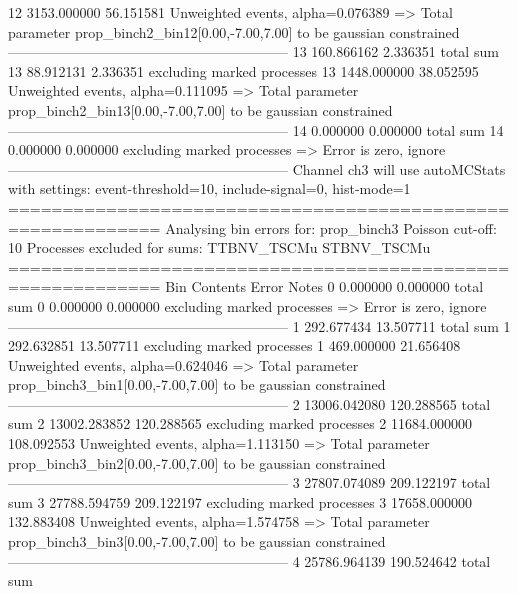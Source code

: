 12         3153.000000     56.151581       Unweighted events, alpha=0.076389
  => Total parameter prop_binch2_bin12[0.00,-7.00,7.00] to be gaussian constrained
------------------------------------------------------------
13         160.866162      2.336351        total sum                     
13         88.912131       2.336351        excluding marked processes    
13         1448.000000     38.052595       Unweighted events, alpha=0.111095
  => Total parameter prop_binch2_bin13[0.00,-7.00,7.00] to be gaussian constrained
------------------------------------------------------------
14         0.000000        0.000000        total sum                     
14         0.000000        0.000000        excluding marked processes    
  => Error is zero, ignore      
------------------------------------------------------------
Channel ch3 will use autoMCStats with settings: event-threshold=10, include-signal=0, hist-mode=1
============================================================
Analysing bin errors for: prop_binch3
Poisson cut-off: 10
Processes excluded for sums: TTBNV_TSCMu STBNV_TSCMu
============================================================
Bin        Contents        Error           Notes                         
0          0.000000        0.000000        total sum                     
0          0.000000        0.000000        excluding marked processes    
  => Error is zero, ignore      
------------------------------------------------------------
1          292.677434      13.507711       total sum                     
1          292.632851      13.507711       excluding marked processes    
1          469.000000      21.656408       Unweighted events, alpha=0.624046
  => Total parameter prop_binch3_bin1[0.00,-7.00,7.00] to be gaussian constrained
------------------------------------------------------------
2          13006.042080    120.288565      total sum                     
2          13002.283852    120.288565      excluding marked processes    
2          11684.000000    108.092553      Unweighted events, alpha=1.113150
  => Total parameter prop_binch3_bin2[0.00,-7.00,7.00] to be gaussian constrained
------------------------------------------------------------
3          27807.074089    209.122197      total sum                     
3          27788.594759    209.122197      excluding marked processes    
3          17658.000000    132.883408      Unweighted events, alpha=1.574758
  => Total parameter prop_binch3_bin3[0.00,-7.00,7.00] to be gaussian constrained
------------------------------------------------------------
4          25786.964139    190.524642      total sum                     
